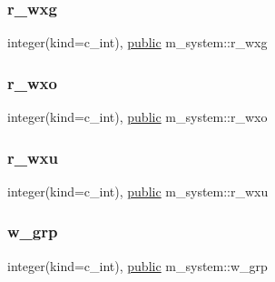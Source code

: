 \mbox{\label{namespacem__system_a23aade9d4537c4260c2e44ef6a619db6}} 
\subsubsection{\texorpdfstring{r\+\_\+wxg}{r\_wxg}}
{\footnotesize\ttfamily integer(kind=c\+\_\+int), \hyperlink{M__stopwatch_83_8txt_a2f74811300c361e53b430611a7d1769f}{public} m\+\_\+system\+::r\+\_\+wxg}

\mbox{\label{namespacem__system_a9467bf0bb7ae96061314b865bde14f57}} 
\subsubsection{\texorpdfstring{r\+\_\+wxo}{r\_wxo}}
{\footnotesize\ttfamily integer(kind=c\+\_\+int), \hyperlink{M__stopwatch_83_8txt_a2f74811300c361e53b430611a7d1769f}{public} m\+\_\+system\+::r\+\_\+wxo}

\mbox{\label{namespacem__system_a10b9cc52ae68d1b64dd9f8ea4cfcd3be}} 
\subsubsection{\texorpdfstring{r\+\_\+wxu}{r\_wxu}}
{\footnotesize\ttfamily integer(kind=c\+\_\+int), \hyperlink{M__stopwatch_83_8txt_a2f74811300c361e53b430611a7d1769f}{public} m\+\_\+system\+::r\+\_\+wxu}

\mbox{\label{namespacem__system_ada5683bd408b30753f7565a1bb54b339}} 
\subsubsection{\texorpdfstring{w\+\_\+grp}{w\_grp}}
{\footnotesize\ttfamily integer(kind=c\+\_\+int), \hyperlink{M__stopwatch_83_8txt_a2f74811300c361e53b430611a7d1769f}{public} m\+\_\+system\+::w\+\_\+grp}

